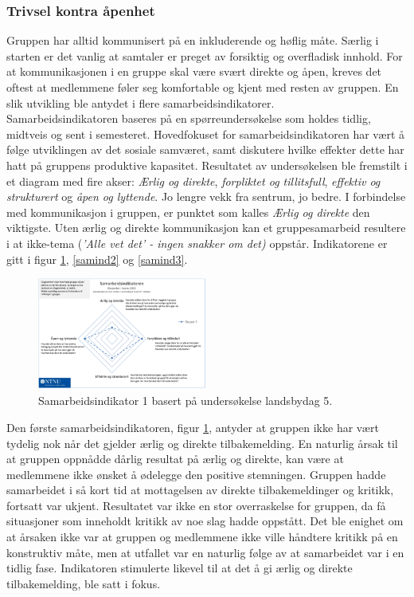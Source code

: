 \subsubsection{Trivsel kontra åpenhet}

Gruppen har alltid kommunisert på en inkluderende og høflig måte. 
Særlig i starten er det vanlig at samtaler er preget av forsiktig og overfladisk innhold. 
For at kommunikasjonen i en gruppe skal være svært direkte og åpen, kreves det oftest at medlemmene føler seg komfortable og kjent med resten av gruppen. 
En slik utvikling ble antydet i flere samarbeidsindikatorer. \\

Samarbeidsindikatoren baseres på en spørreundersøkelse som holdes tidlig, midtveis og sent i semesteret.
Hovedfokuset for samarbeidsindikatoren har vært å følge utviklingen av det sosiale samværet, samt diskutere hvilke effekter dette har hatt på gruppens produktive kapasitet.
Resultatet av undersøkelsen ble fremstilt i et diagram med fire akser: \textit{Ærlig og direkte}, \textit{forpliktet og tillitsfull}, \textit{effektiv og strukturert} og \textit{åpen og lyttende}.
Jo lengre vekk fra sentrum, jo bedre.
I forbindelse med kommunikasjon i gruppen, er punktet som kalles \textit{Ærlig og direkte} den viktigste. 
Uten ærlig og direkte kommunikasjon kan et gruppesamarbeid resultere i at ikke-tema (\textit{'Alle vet det' - ingen snakker om det)} oppstår.
Indikatorene er gitt i figur \ref{samind1}, \ref{samind2} og \ref{samind3}.

\begin{figure}[h!]
  \centering
    \includegraphics[width=0.5\textwidth]{Bilder/samarbeidsindikator1.png}
  \caption{Samarbeidsindikator 1 basert på undersøkelse landsbydag 5.}
    \label{samind1}
\end{figure}

Den første samarbeidsindikatoren, figur \ref{samind1}, antyder at gruppen ikke har vært tydelig nok når det gjelder ærlig og direkte tilbakemelding.
En naturlig årsak til at gruppen oppnådde dårlig resultat på ærlig og direkte, kan være at medlemmene ikke ønsket å ødelegge den positive stemningen.
Gruppen hadde samarbeidet i så kort tid at mottagelsen av direkte tilbakemeldinger og kritikk, fortsatt var ukjent.
Resultatet var ikke en stor overraskelse for gruppen, da få situasjoner som inneholdt kritikk av noe slag hadde oppstått.
Det ble enighet om at årsaken ikke var at gruppen og medlemmene ikke ville håndtere kritikk på en konstruktiv måte, men at utfallet var en naturlig følge av at samarbeidet var i en tidlig fase.
Indikatoren stimulerte likevel til at det å gi ærlig og direkte tilbakemelding, ble satt i fokus. \\

